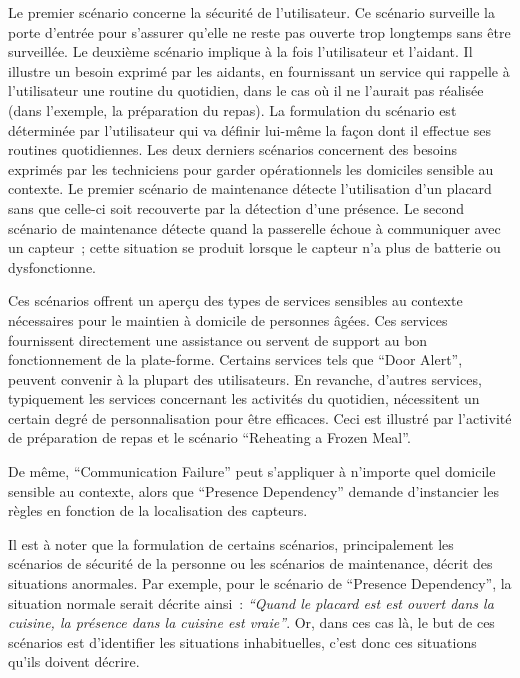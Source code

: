 Le premier scénario concerne la sécurité de l'utilisateur. Ce scénario
surveille la porte d'entrée pour s'assurer qu'elle ne reste pas
ouverte trop longtemps sans être surveillée.  Le deuxième scénario
implique à la fois l'utilisateur et l'aidant. Il illustre un besoin
exprimé par les aidants, en fournissant un service qui rappelle à
l'utilisateur une routine du quotidien, dans le cas où il ne l'aurait
pas réalisée (dans l'exemple, la préparation du repas). La formulation du
scénario est déterminée par l'utilisateur qui va définir lui-même la
façon dont il effectue ses routines quotidiennes.
Les deux derniers scénarios concernent des besoins exprimés par les techniciens 
pour garder opérationnels les domiciles sensible au contexte. 
Le premier scénario de maintenance détecte l'utilisation d'un placard sans que 
celle-ci soit recouverte par la détection d'une présence. 
Le second scénario de maintenance détecte quand la passerelle échoue à 
communiquer avec un capteur~;
cette situation se produit lorsque le capteur n'a plus de batterie ou dysfonctionne.

Ces scénarios offrent un aperçu des types de services sensibles au contexte 
nécessaires pour le maintien à domicile de personnes âgées. 
Ces services fournissent directement une assistance ou servent de support au 
bon fonctionnement de la plate-forme.
Certains services tels que ``Door Alert'', peuvent convenir à la plupart des 
utilisateurs. En revanche, d'autres services, typiquement les services concernant 
les activités du quotidien, nécessitent un certain degré de personnalisation pour 
être efficaces. Ceci est illustré par l'activité de préparation de repas et 
le scénario ``Reheating a Frozen Meal''.

De même, ``Communication Failure'' peut s'appliquer à n'importe quel 
domicile sensible au contexte, alors que ``Presence Dependency'' demande 
d'instancier les règles en fonction de la localisation des capteurs. 

Il est à noter que la formulation de certains scénarios, principalement les scénarios de sécurité de la personne ou les scénarios de maintenance, décrit des situations anormales. Par exemple, pour le scénario de ``Presence Dependency'', la situation normale serait décrite ainsi~: {\it ``Quand le placard est est ouvert dans la cuisine, la présence dans la cuisine est vraie''}. Or, dans ces cas là, le but de ces scénarios est d'identifier les situations inhabituelles, c'est donc ces situations qu'ils doivent décrire.

